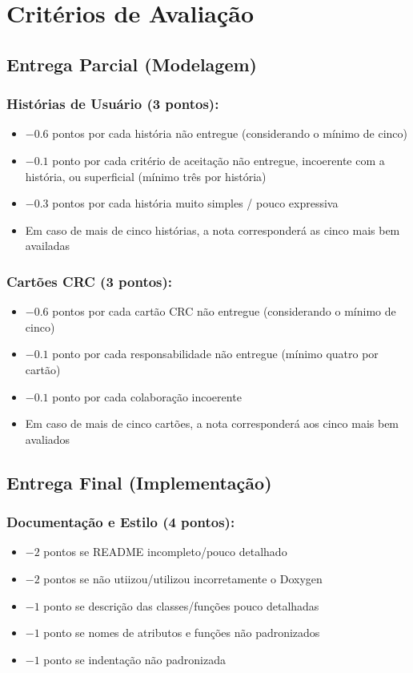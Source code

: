 \documentclass[11pt]{article}
\begin{document}
\section{Critérios de Avaliação}
\label{sec:org669a351}

\subsection{Entrega Parcial (Modelagem)}
\label{sec:org680a089}

\subsubsection{Histórias de Usuário (3 pontos):}
\label{sec:org0b77a78}
\begin{itemize}
\item \(-0.6\) pontos por cada história não entregue (considerando o mínimo de cinco)
\item \(-0.1\) ponto por cada critério de aceitação não entregue,
incoerente com a história, ou superficial (mínimo três por história)
\item \(-0.3\) pontos por cada história muito simples / pouco expressiva
\item Em caso de mais de cinco histórias, a nota corresponderá as cinco
mais bem availadas
\end{itemize}
\subsubsection{Cartões CRC (3 pontos):}
\label{sec:org494e0bf}
\begin{itemize}
\item \(-0.6\) pontos por cada cartão CRC não entregue (considerando o mínimo de cinco)
\item \(-0.1\) ponto por cada responsabilidade não entregue (mínimo  quatro por cartão)
\item \(-0.1\) ponto por cada colaboração incoerente
\item Em caso de mais de cinco cartões, a nota corresponderá aos cinco
mais bem avaliados
\end{itemize}
\subsection{Entrega Final (Implementação)}
\label{sec:org1af6862}

\subsubsection{Documentação e Estilo (4 pontos):}
\label{sec:orgd54068b}
\begin{itemize}
\item \(-2\) pontos se README incompleto/pouco detalhado
\item \(-2\) pontos se não utiizou/utilizou incorretamente o Doxygen
\item \(-1\) ponto se descrição das classes/funções pouco detalhadas
\item \(-1\) ponto se nomes de atributos e funções não padronizados
\item \(-1\) ponto se indentação não padronizada
\end{itemize}
\end{document}
